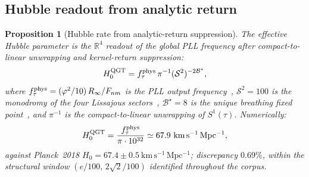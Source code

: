 \documentclass[twocolumn,10pt]{article}
\newcommand{\vp}{\varphi}
\newcommand{\Rfour}{\mathbb{R}^4}
\newtheorem{proposition}[theorem]{Proposition}
\begin{document}
\subsection{Hubble readout from analytic return}
\label{sec:h0}

\begin{proposition}[Hubble rate from analytic-return suppression]
\label{prop:h0}
The effective Hubble parameter is the $\Rfour$ readout of the global
PLL frequency after compact-to-linear unwrapping and kernel-return
suppression:
\begin{equation}
  H_0^{\rm QGT}
  = f_\tau^{\rm phys}\,\pi^{-1}(\mathcal{S}^2)^{-2\mathcal{B}^\star},
  \label{eq:h0_struct}
\end{equation}
where $f_\tau^{\rm phys}=(\vp^2/10)\,R_\infty/F_{nm}$ is the PLL
output frequency~\cite{CamP13}, $\mathcal{S}^2=100$ is the
monodromy of the four Lissajous sectors~\cite{CamP09,CamP13},
$\mathcal{B}^\star=8$ is the unique breathing fixed point~\cite{CamP11},
and $\pi^{-1}$ is the compact-to-linear unwrapping of $S^1(\tau)$.
Numerically:
\begin{equation*}
  H_0^{\rm QGT}
  = \frac{f_\tau^{\rm phys}}{\pi\cdot 10^{32}}
  \simeq 67.9~\mathrm{km\,s^{-1}\,Mpc^{-1}},
\end{equation*}
against Planck~2018 $H_0=67.4\pm0.5~\mathrm{km\,s^{-1}\,Mpc^{-1}}$;
discrepancy $0.69\%$, within the structural window
$(e/100,\,2\sqrt{2}/100)$ identified throughout the corpus.
\end{proposition}
\end{document}
